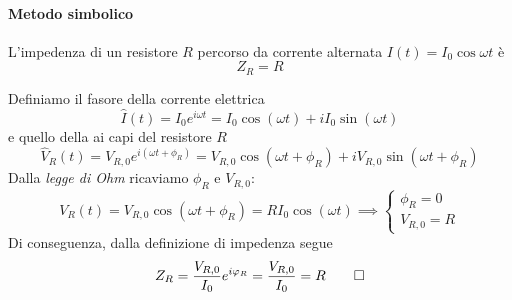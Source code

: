 \paragraph{Metodo simbolico}
\begin{proposition}
	L'impedenza di un resistore $R$ percorso da corrente alternata $I(t)=I_0\cos\omega t$ è
	\begin{equation}
		Z_R=R
	\end{equation}
\end{proposition}
\begin{demonstration} %
	Definiamo il fasore della corrente elettrica
	\begin{equation*}
		\hat{I}(t)=I_0e^{i\omega t}=I_0\cos(\omega t)+iI_0\sin(\omega t)
	\end{equation*}
	e quello della \ddp ai capi del resistore $R$
	\begin{equation*}
		\hat{V}_R(t)=V_{R,0}e^{i(\omega t+\phi_R)}=V_{R,0}\cos(\omega t+\phi_R)+iV_{R,0}\sin(\omega t+\phi_R)
	\end{equation*}
	Dalla \textit{legge di Ohm} ricaviamo $\phi_R$ e $V_{R,0}$:
	\begin{equation*}
		V_R(t)=V_{R,0}\cos(\omega t+\phi_R)=RI_0\cos(\omega t)\implies \begin{cases}
			\phi_R=0\\
			V_{R,0}=R
		\end{cases} 
	\end{equation*}
	Di conseguenza, dalla definizione di impedenza segue
	\begin{equation*}
		Z_R=\frac{V_{R,0}}{I_0}e^{i\oldphi_R}=\frac{V_{R,0}}{I_0}=R\qedhere
	\end{equation*}
\end{demonstration}
